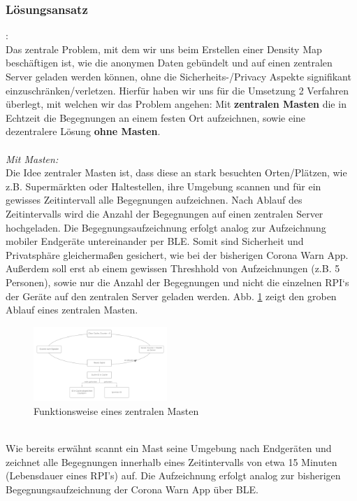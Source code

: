 \documentclass[conference]{IEEEtran}
\begin{document}
\subsubsection{Lösungsansatz}:\\
Das zentrale Problem, mit dem wir uns beim Erstellen einer Density Map beschäftigen ist, wie die anonymen Daten gebündelt und auf einen zentralen Server geladen werden können, ohne die Sicherheits-/Privacy Aspekte signifikant einzuschränken/verletzen. 
Hierfür haben wir uns für die Umsetzung 2 Verfahren überlegt, mit welchen wir das Problem angehen: Mit \textbf{zentralen Masten} die in Echtzeit die Begegnungen an einem festen Ort aufzeichnen, sowie eine dezentralere Lösung \textbf{ohne Masten}. \\ \\
\textit{Mit Masten: }\\
Die Idee zentraler Masten ist, dass diese an stark besuchten Orten/Plätzen, wie z.B. Supermärkten oder Haltestellen, ihre Umgebung scannen und für ein gewisses Zeitintervall alle Begegnungen aufzeichnen. 
Nach Ablauf des Zeitintervalls wird die Anzahl der Begegnungen auf einen zentralen Server hochgeladen. 
Die Begegnungsaufzeichnung erfolgt analog zur Aufzeichnung mobiler Endgeräte untereinander per BLE. 
Somit sind Sicherheit und Privatsphäre gleichermaßen gesichert, wie bei der bisherigen Corona Warn App. 
Außerdem soll erst ab einem gewissen Threshhold von Aufzeichnungen (z.B. 5 Personen), sowie nur die Anzahl der Begegnungen und nicht die einzelnen RPI‘s der Geräte auf den zentralen Server geladen werden. 
Abb. \ref{mast_func} zeigt den groben Ablauf eines zentralen Masten. \\ 
\begin{figure}[h]
	\centering
	\includegraphics[width=0.45\textwidth]{"Mast_functionality"}
	\caption{Funktionsweise eines zentralen Masten}
	\label{mast_func}
\end{figure}
\\
Wie bereits erwähnt scannt ein Mast seine Umgebung nach Endgeräten und zeichnet alle Begegnungen innerhalb eines Zeitintervalls von etwa 15 Minuten (Lebensdauer eines RPI's) auf. 
Die Aufzeichnung erfolgt analog zur bisherigen Begegnungsaufzeichnung der Corona Warn App über BLE. 
\end{document}
